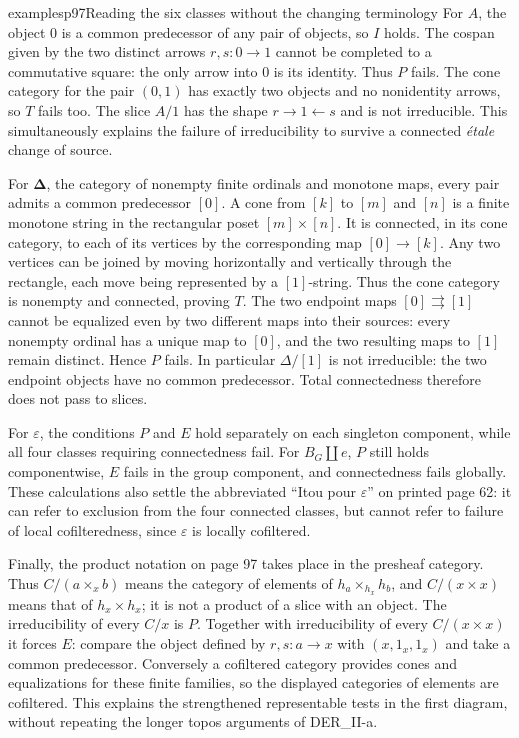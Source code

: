 \begin{dcomment}{examples}{p97}{Reading the six classes without the changing terminology}
For $A$, the object $0$ is a common predecessor of any pair of objects, so $I$ holds. The cospan given by the two distinct arrows $r,s:0\to1$ cannot be completed to a commutative square: the only arrow into $0$ is its identity. Thus $P$ fails. The cone category for the pair $(0,1)$ has exactly two objects and no nonidentity arrows, so $T$ fails too. The slice $A/1$ has the shape $r\to1\leftarrow s$ and is not irreducible. This simultaneously explains the failure of irreducibility to survive a connected \emph{\'etale} change of source.

For $\boldsymbol\Delta$, the category of nonempty finite ordinals and monotone maps, every pair admits a common predecessor $[0]$. A cone from $[k]$ to $[m]$ and $[n]$ is a finite monotone string in the rectangular poset $[m]\times[n]$. It is connected, in its cone category, to each of its vertices by the corresponding map $[0]\to[k]$. Any two vertices can be joined by moving horizontally and vertically through the rectangle, each move being represented by a $[1]$-string. Thus the cone category is nonempty and connected, proving $T$. The two endpoint maps $[0]\rightrightarrows[1]$ cannot be equalized even by two different maps into their sources: every nonempty ordinal has a unique map to $[0]$, and the two resulting maps to $[1]$ remain distinct. Hence $P$ fails. In particular $\Delta/[1]$ is not irreducible: the two endpoint objects have no common predecessor. Total connectedness therefore does not pass to slices.

For $\varepsilon$, the conditions $P$ and $E$ hold separately on each singleton component, while all four classes requiring connectedness fail. For $B_G\amalg e$, $P$ still holds componentwise, $E$ fails in the group component, and connectedness fails globally. These calculations also settle the abbreviated ``Itou pour $\varepsilon$'' on printed page 62: it can refer to exclusion from the four connected classes, but cannot refer to failure of local cofilteredness, since $\varepsilon$ is locally cofiltered.

Finally, the product notation on page 97 takes place in the presheaf category. Thus $C/(a\times_x b)$ means the category of elements of $h_a\times_{h_x}h_b$, and $C/(x\times x)$ means that of $h_x\times h_x$; it is not a product of a slice with an object. The irreducibility of every $C/x$ is $P$. Together with irreducibility of every $C/(x\times x)$ it forces $E$: compare the object defined by $r,s:a\to x$ with $(x,1_x,1_x)$ and take a common predecessor. Conversely a cofiltered category provides cones and equalizations for these finite families, so the displayed categories of elements are cofiltered. This explains the strengthened representable tests in the first diagram, without repeating the longer topos arguments of DER\_II-a.
\end{dcomment}

